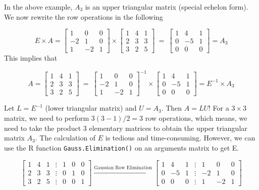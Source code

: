 \documentclass[
]{book}
\begin{document}
\hfill\break

In the above example, \(A_3\) is an upper triangular matrix (special echelon form). We now rewrite the row operations in the following

\[
E\times A = \left[\begin{array}{cccc} 
1 & 0 & 0   \\ 
-2 & 1 & 0  \\ 
1 & -2 & 1  
\end{array}
\right]
\times
\left[\begin{array}{cccc} 
1 & 4 & 1   \\ 
2 & 3 & 3  \\ 
3 & 2 & 5  
\end{array}
\right]
~
=
~
\left[\begin{array}{cccc} 
1 & 4 & 1   \\ 
0 & -5 & 1  \\ 
0 & 0 & 0  
\end{array}
\right] = A_3
\]
This implies that

\[
A =
\left[\begin{array}{cccc} 
1 & 4 & 1   \\ 
2 & 3 & 3  \\ 
3 & 2 & 5  
\end{array}
\right]
~
=
~
\left[\begin{array}{cccc} 
1 & 0 & 0   \\ 
-2 & 1 & 0  \\ 
1 & -2 & 1  
\end{array}
\right]^{-1}
\times
\left[\begin{array}{cccc} 
1 & 4 & 1   \\ 
0 & -5 & 1  \\ 
0 & 0 & 0  
\end{array}
\right] = E^{-1}\times A_3
\]

Let \(L = E^{-1}\) (lower triangular matrix) and \(U = A_3\). Then \(A = LU\)! For a \(3 \times 3\) matrix, we need to perform \(3(3-1)/2 = 3\) row operations, which means, we need to take the product 3 elementary matrices to obtain the upper triangular matrix \(A_3\). The calculation of \(E\) is tedious and time-consuming. However, we can use the R function \texttt{Gauss.Elimination()} on an arguments matrix to get E.

\[
\left[\begin{array}{ccccccc} 
1 & 4 & 1 & \vdots & 1 & 0 & 0  \\ 
2 & 3 & 3 & \vdots & 0 & 1 & 0  \\  
3 & 2 & 5 & \vdots & 0 & 0 & 1    
\end{array}
\right]
\xrightarrow{\text{Gaussian Row Elimination}}
\left[\begin{array}{cccccccc} 
1 & 4 & 1  & \vdots & 1 & 0 & 0  \\ 
0 & -5 & 1 & \vdots &-2 & 1 & 0  \\  
0 & 0 & 0  & \vdots & 1 & -2 & 1    
\end{array}
\right]
\]
\end{document}
